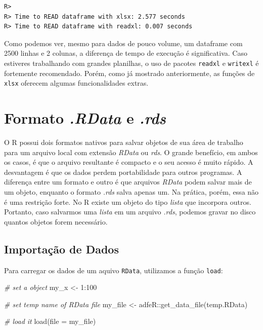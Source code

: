\documentclass[
  11pt,
]{book}
\newenvironment{Shaded}{\begin{snugshade}}{\end{snugshade}}
\newcommand{\AttributeTok}[1]{\textcolor[rgb]{0.61,0.61,0.61}{#1}}
\newcommand{\CommentTok}[1]{\textcolor[rgb]{0.37,0.37,0.37}{\textit{#1}}}
\newcommand{\DecValTok}[1]{\textcolor[rgb]{0.06,0.06,0.06}{#1}}
\newcommand{\FunctionTok}[1]{\textcolor[rgb]{0,0,0}{#1}}
\newcommand{\NormalTok}[1]{#1}
\newcommand{\OtherTok}[1]{\textcolor[rgb]{0.37,0.37,0.37}{#1}}
\newcommand{\SpecialCharTok}[1]{\textcolor[rgb]{0,0,0}{#1}}
\newcommand{\StringTok}[1]{\textcolor[rgb]{0.5,0.5,0.5}{#1}}
\begin{document}
\begin{verbatim}
R> 
R> Time to READ dataframe with xlsx: 2.577 seconds
R> Time to READ dataframe with readxl: 0.007 seconds
\end{verbatim}

Como podemos ver, mesmo para dados de pouco volume, um dataframe com 2500 linhas e 2 colunas, a diferença de tempo de execução é significativa. Caso estiveres trabalhando com grandes planilhas, o uso de pacotes \texttt{readxl} e \texttt{writexl} é fortemente recomendado. Porém, como já mostrado anteriormente, as funções de \texttt{xlsx} oferecem algumas funcionalidades extras.

\hypertarget{formato-.rdata-e-.rds}{%
\section{\texorpdfstring{Formato \emph{.RData} e \emph{.rds}}{Formato .RData e .rds}}\label{formato-.rdata-e-.rds}}

O R possui dois formatos nativos para salvar objetos de sua área de trabalho para um arquivo local com extensão \emph{RData} ou \emph{rds}. O grande benefício, em ambos os casos, é que o arquivo resultante é compacto e o seu acesso é muito rápido. A desvantagem é que os dados perdem portabilidade para outros programas. A diferença entre um formato e outro é que arquivos \emph{RData} podem salvar mais de um objeto, enquanto o formato \emph{.rds} salva apenas um. Na prática, porém, essa não é uma restrição forte. No R existe um objeto do tipo \emph{lista} que incorpora outros. Portanto, caso salvarmos uma \emph{lista} em um arquivo \emph{.rds}, podemos gravar no disco quantos objetos forem necessário.

\hypertarget{importauxe7uxe3o-de-dados-2}{%
\subsection{Importação de Dados}\label{importauxe7uxe3o-de-dados-2}}

Para carregar os dados de um aquivo \texttt{RData}, utilizamos a função \texttt{load}: 

\begin{Shaded}
\begin{Highlighting}[]
\CommentTok{\# set a object}
\NormalTok{my\_x }\OtherTok{\textless{}{-}} \DecValTok{1}\SpecialCharTok{:}\DecValTok{100}

\CommentTok{\# set temp name of RData file}
\NormalTok{my\_file }\OtherTok{\textless{}{-}}\NormalTok{ adfeR}\SpecialCharTok{::}\FunctionTok{get\_data\_file}\NormalTok{(}\StringTok{\textquotesingle{}temp.RData\textquotesingle{}}\NormalTok{)}

\CommentTok{\# load it}
\FunctionTok{load}\NormalTok{(}\AttributeTok{file =}\NormalTok{ my\_file)}
\end{Highlighting}
\end{Shaded}
\end{document}
